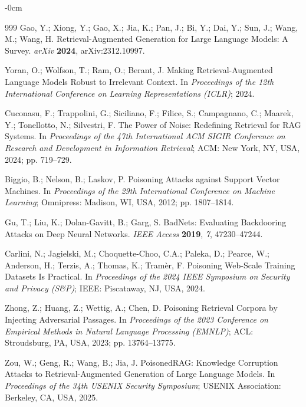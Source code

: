 \documentclass[information,article,submit,moreauthors]{Definitions/mdpi}
\begin{document}
\begin{adjustwidth}{-\extralength}{0cm}
\begin{thebibliography}{999}
Gao, Y.; Xiong, Y.; Gao, X.; Jia, K.; Pan, J.; Bi, Y.; Dai, Y.; Sun, J.; Wang, M.; Wang, H.
Retrieval-Augmented Generation for Large Language Models: A Survey. \textit{arXiv}
\textbf{2024}, arXiv:2312.10997.

Yoran, O.; Wolfson, T.; Ram, O.; Berant, J. Making Retrieval-Augmented Language Models Robust
to Irrelevant Context. In \textit{Proceedings of the 12th International Conference on Learning
Representations (ICLR)}; 2024.

Cuconasu, F.; Trappolini, G.; Siciliano, F.; Filice, S.; Campagnano, C.; Maarek, Y.;
Tonellotto, N.; Silvestri, F. The Power of Noise: Redefining Retrieval for RAG Systems. In
\textit{Proceedings of the 47th International ACM SIGIR Conference on Research and Development
in Information Retrieval}; ACM: New York, NY, USA, 2024; pp. 719--729.


Biggio, B.; Nelson, B.; Laskov, P. Poisoning Attacks against Support Vector Machines. In
\textit{Proceedings of the 29th International Conference on Machine Learning}; Omnipress:
Madison, WI, USA, 2012; pp. 1807--1814.

Gu, T.; Liu, K.; Dolan-Gavitt, B.; Garg, S. BadNets: Evaluating Backdooring Attacks on Deep
Neural Networks. \textit{IEEE Access} \textbf{2019}, \textit{7}, 47230--47244.

Carlini, N.; Jagielski, M.; Choquette-Choo, C.A.; Paleka, D.; Pearce, W.; Anderson, H.;
Terzis, A.; Thomas, K.; Tram\`er, F. Poisoning Web-Scale Training Datasets Is Practical. In
\textit{Proceedings of the 2024 IEEE Symposium on Security and Privacy (S\&P)}; IEEE:
Piscataway, NJ, USA, 2024.

Zhong, Z.; Huang, Z.; Wettig, A.; Chen, D. Poisoning Retrieval Corpora by Injecting Adversarial
Passages. In \textit{Proceedings of the 2023 Conference on Empirical Methods in Natural
Language Processing (EMNLP)}; ACL: Stroudsburg, PA, USA, 2023; pp. 13764--13775.

Zou, W.; Geng, R.; Wang, B.; Jia, J. PoisonedRAG: Knowledge Corruption Attacks to
Retrieval-Augmented Generation of Large Language Models. In \textit{Proceedings of the 34th
USENIX Security Symposium}; USENIX Association: Berkeley, CA, USA, 2025.


\end{thebibliography}
\end{adjustwidth}
\end{document}
